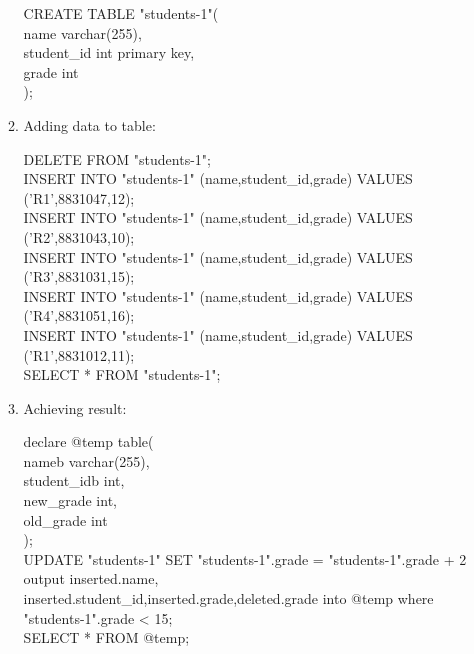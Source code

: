 \documentclass{article}
\begin{document}
\begin{enumerate}
\begin{enumerate}
			CREATE TABLE "students-1"(\\
				name varchar(255),\\
				student\_id int primary key,\\
				grade int\\
			);\\
	\item Adding data to table:

		DELETE FROM "students-1";\\
	INSERT INTO "students-1" (name,student\_id,grade) VALUES ('R1',8831047,12);\\
INSERT INTO "students-1" (name,student\_id,grade) VALUES ('R2',8831043,10);\\
		INSERT INTO "students-1" (name,student\_id,grade) VALUES ('R3',8831031,15);\\
	INSERT INTO "students-1" (name,student\_id,grade) VALUES ('R4',8831051,16);\\
INSERT INTO "students-1" (name,student\_id,grade) VALUES ('R1',8831012,11);\\
		SELECT * FROM "students-1";\\
\item Achieving result:

	declare @temp table(\\
		nameb varchar(255),\\
		student\_idb int,\\
		new\_grade int,\\
		old\_grade int\\
	);\\
UPDATE "students-1" SET "students-1".grade = "students-1".grade + 2 output inserted.name,\\
inserted.student\_id,inserted.grade,deleted.grade into @temp where "students-1".grade < 15;\\
		SELECT * FROM @temp;\\
	\end{enumerate}
\end{enumerate}
\end{document}
